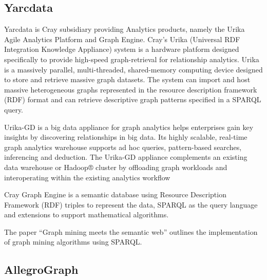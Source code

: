 \subsection{Yarcdata}

     Yarcdata is Cray subsidiary providing Analytics
     products, namely the Urika Agile Analytics Platform and Graph
     Engine. Cray’s Urika (Universal RDF Integration Knowledge
     Appliance) system \cite{www-Urika-appliance} is a hardware
     platform designed specifically to provide high-speed
     graph-retrieval for relationship analytics. Urika is a massively
     parallel, multi-threaded, shared-memory computing device designed
     to store and retrieve massive graph datasets. The system can
     import and host massive heterogeneous graphs represented in the
     resource description framework (RDF) format and can retrieve
     descriptive graph patterns specified in a SPARQL query.

     Urika-GD \cite{techspec-Urika-GD} is a big data appliance for
     graph analytics helps enterprises gain key insights by
     discovering relationships in big data. Its highly scalable,
     real-time graph analytics warehouse supports ad hoc queries,
     pattern-based searches, inferencing and deduction. The Urika-GD
     appliance complements an existing data warehouse or Hadoop®
     cluster by offloading graph workloads and interoperating within
     the existing analytics workflow

     Cray Graph Engine \cite{paper-graph-data} is a semantic database
     using Resource Description Framework (RDF) triples to represent
     the data, SPARQL as the query language and extensions to support
     mathematical algorithms.

     The paper ``Graph mining meets the semantic web''
     \cite{paper-lee2015graph} outlines the implementation of graph
     mining algorithms using SPARQL.

\subsection{AllegroGraph}
     
